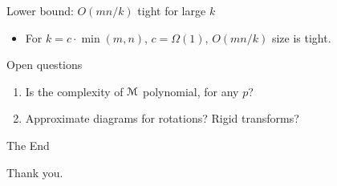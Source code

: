 \documentclass[xcolor={dvipsnames,usenames},handout]{beamer} %
\newcommand{\M}{\EuScript{M}}
\begin{document}
\begin{frame}{Lower bound: $O(mn/k)$ tight for large $k$}
\begin{itemize}
\item For $k = c\cdot\min(m, n)$, $c = \Omega(1)$, $O(mn/k)$ size is tight.
\end{itemize}
\end{frame}

\begin{frame}{Open questions}
\begin{enumerate}
\item Is the complexity of $\M$ polynomial, for any $p$?
\item Approximate diagrams for rotations? Rigid transforms?
\end{enumerate}
\end{frame}


\begin{frame}{The End}
\begin{center}
	Thank you.
\end{center}
\end{frame}

%
%
\end{document}
